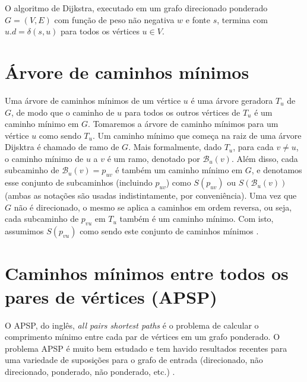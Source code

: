 \begin{definition}
	O algoritmo de Dijkstra, executado em um grafo direcionado ponderado $G = (V, E)$ com função de peso não negativa $w$ e fonte $s$, termina com $u.d = \delta(s, u)$ para todos os vértices $u \in V$.
\end{definition}

\section{Árvore de caminhos mínimos}
Uma árvore de caminhos mínimos de um vértice $u$ é uma árvore geradora $T_u$ de $G$, de modo que o caminho de $u$ para todos os outros vértices de $T_u$ é um caminho mínimo em $G$. Tomaremos a árvore de caminho mínimos para um vértice $u$ como sendo $T_u$. Um caminho mínimo que começa na raiz de uma árvore Dijsktra é chamado de ramo de $G$. Mais formalmente, dado $T_u$, para cada $v \neq u$, o caminho mínimo de $u$ a $v$ é um ramo, denotado por $\mathcal{B}_u(v)$. Além disso, cada subcaminho de $\mathcal{B}_u(v) = p_{uv}$ é também um caminho mínimo em $G$, e denotamos esse conjunto de subcaminhos (incluindo $p_{uv}$) como $S(p_{uv})$ ou $S(\mathcal{B}_u(v))$ (ambas as notações são usadas indistintamente, por conveniência). Uma vez que $G$ não é direcionado, o mesmo se aplica a caminhos em ordem reversa, ou seja, cada subcaminho de $p_{vu}$ em $T_u$ também é um caminho mínimo. Com isto, assumimos $S(p_{vu})$ como sendo este conjunto de caminhos mínimos \cite{alane2021}.

\section{Caminhos mínimos entre todos os pares de vértices (APSP)}
O APSP, do inglês, {\it all pairs shortest paths} é o problema de calcular o comprimento mínimo entre cada par de vértices em um grafo ponderado. O problema APSP é muito bem estudado e tem havido resultados recentes para uma variedade de suposições para o grafo de entrada (direcionado, não direcionado, ponderado, não ponderado, etc.) \cite{alane2021} \cite{williams2014} \cite{pettie2002}.

